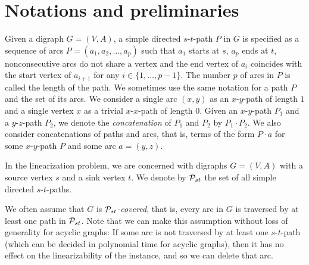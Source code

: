 \section{Notations  and preliminaries}\label{defi:sec}
 Given a digraph $G=(V,A)$, a simple directed $s$-$t$-path $P$ in $G$ is specified as a sequence of
arcs $P=(a_1,a_2,\ldots,a_p)$ such that  $a_1$ starts at $s$, $a_p$
ends at $t$, nonconsecutive arcs do not share a vertex and  the end vertex of $a_{i}$ coincides with  the start vertex of $a_{i+1}$ for any $i\in \{1,\ldots,p-1\}$. The number
$p$ of arcs in $P$ is called the length of the path. We sometimes use the same notation for a path $P$ and the  set of its arcs. 
We  consider a single arc $(x, y)$ as an $x$-$y$-path of length $1$  and a single vertex $x$ as a  trivial $x$-$x$-path of length $0$. Given an  $x$-$y$-path $P_1$ and a  $y$-$z$-path $P_2$, we denote the \emph{concatenation} of $P_1$ and $P_2$ by $P_1 \cdot P_2$. We also consider concatenations of paths and arcs, that is, terms of the form $P \cdot a$ for some $x$-$y$-path $P$ and some arc $a = (y, z)$.
 
In the linearization problem, we are concerned with digraphs $G =(V, A)$ with a source vertex $s$ and a sink vertex $t$. 
We denote by  $\mathcal{P}_{st}$ the set of all simple directed $s$-$t$-paths.

We often assume that $G$ is \emph{$\mathcal{P}_{st}$-covered}, that is, every arc in $G$ is traversed by at least one path in $\mathcal{P}_{st}$. 
Note that we can make this assumption without loss of generality for acyclic graphs: If some arc is not traversed by at least one $s$-$t$-path (which can be decided in polynomial time for acyclic graphs), then it has no effect on the linearizability of the instance, and so we can delete that arc. 

